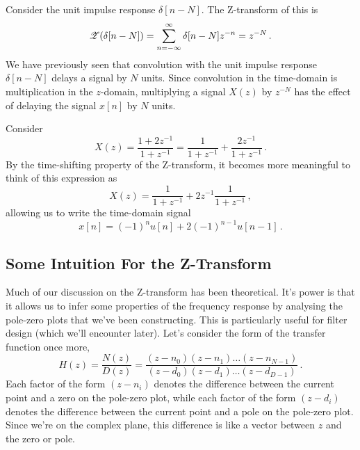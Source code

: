 %
\begin{exmp}
  Consider the unit impulse response $\delta[n-N]$. The Z-transform of this is
  \begin{displaymath}
    \mathscr{Z}(\delta[n-N]) = \sum_{n=-\infty}^\infty\delta[n-N]z^{-n} = z^{-N} \,.
  \end{displaymath}
  We have previously seen that convolution with the unit impulse response
  $\delta[n-N]$ delays a signal by $N$ units. Since convolution in the time-domain
  is multiplication in the $z$-domain, multiplying a signal $X(z)$ by $z^{-N}$
  has the effect of delaying the signal $x[n]$ by $N$ units.
\end{exmp}
%
\begin{exmp}
  Consider
  \begin{displaymath}
    X(z) = \frac{1 + 2z^{-1}}{1 + z^{-1}} = \frac{1}{1 + z^{-1}} + \frac{2z^{-1}}{1 + z^{-1}}\,.
  \end{displaymath}
  By the time-shifting property of the Z-transform, it becomes
  more meaningful to think of this expression as
  \begin{displaymath}
    X(z) = \frac{1}{1 + z^{-1}} + 2z^{-1}\frac{1}{1 + z^{-1}} \,,
  \end{displaymath}
  allowing us to write the time-domain signal
  \begin{displaymath}
    x[n] = (-1)^n u[n] + 2(-1)^{n-1}u[n-1] \,.
  \end{displaymath}
\end{exmp}

\subsection{Some Intuition For the Z-Transform}
%
Much of our discussion on the Z-transform has been theoretical.
It's power is that it allows us to infer some properties of the frequency
response by analysing the pole-zero plots that we've been constructing.
This is particularly useful for filter design (which we'll encounter later).
Let's consider the form of the transfer function once more,
%
\begin{displaymath}
  H(z) = \frac{N(z)}{D(z)}
  = \frac{(z-n_0)(z-n_1)\hdots(z-n_{N-1})}{(z-d_0)(z-d_1)\hdots(z-d_{D-1})} \,.
\end{displaymath}
%
Each factor of the form $(z-n_i)$ denotes the difference between the current
point and a zero on the pole-zero plot, while each factor of the form
$(z-d_i)$ denotes the difference between the current point and a pole on
the pole-zero plot. Since we're on the complex plane, this difference is
like a vector between $z$ and the zero or pole. 

